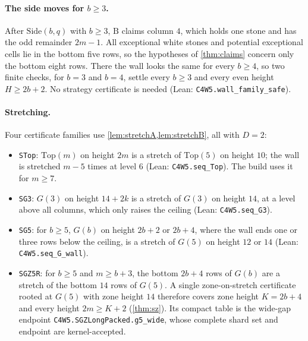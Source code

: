 \documentclass[11pt,a4paper]{article}
\theoremstyle{plain}
\theoremstyle{definition}
\newcommand{\code}[1]{{\upshape\texttt{\small\nolinkurl{#1}}}}
\newcommand{\leanref}[1]{(Lean: \code{#1})}
\newcommand{\B}{\mathrm{B}}
\newcommand{\Top}{\mathrm{Top}}
\newcommand{\Side}{\mathrm{Side}}
\begin{document}
\paragraph{The side moves for $b\ge 3$.} After $\Side(b,q)$ with $b\ge 3$, $\B$ claims column $4$, which holds one stone and has the odd remainder $2m-1$. All exceptional white stones and potential exceptional cells lie in the bottom five rows, so the hypotheses of \cref{thm:claims} concern only the bottom eight rows. There the wall looks the same for every $b\ge 4$, so two finite checks, for $b=3$ and $b=4$, settle every $b\ge 3$ and every even height $H\ge 2b+2$. No strategy certificate is needed \leanref{C4W5.wall_family_safe}.

\paragraph{Stretching.} Four certificate families use \cref{lem:stretchA,lem:stretchB}, all with $D=2$:
\begin{itemize}
  \item \code{STop}: $\Top(m)$ on height $2m$ is a stretch of $\Top(5)$ on height $10$; the wall is stretched $m-5$ times at level $6$ \leanref{C4W5.seq_Top}. The build uses it for $m\ge 7$.
  \item \code{SG3}: $G(3)$ on height $14+2k$ is a stretch of $G(3)$ on height $14$, at a level above all columns, which only raises the ceiling \leanref{C4W5.seq_G3}.
  \item \code{SG5}: for $b\ge 5$, $G(b)$ on height $2b+2$ or $2b+4$, where the wall ends one or three rows below the ceiling, is a stretch of $G(5)$ on height $12$ or $14$ \leanref{C4W5.seq_G_wall}.
  \item \code{SGZ5R}: for $b\ge 5$ and $m\ge b+3$, the bottom $2b+4$ rows of $G(b)$ are a stretch of the bottom $14$ rows of $G(5)$. A single zone-on-stretch certificate rooted at $G(5)$ with zone height $14$ therefore covers zone height $K=2b+4$ and every height $2m\ge K+2$ (\cref{thm:sz}). Its compact table is the wide-gap endpoint \code{C4W5.SGZLongPacked.g5_wide}, whose complete shard set and endpoint are kernel-accepted.
\end{itemize}
\end{document}
